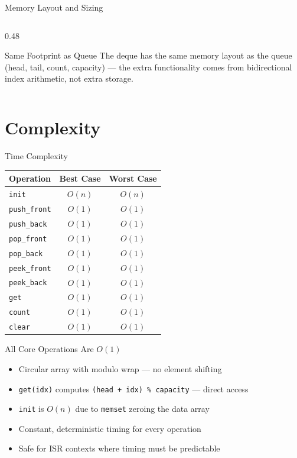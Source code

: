 \documentclass[aspectratio=169, 10pt]{beamer}
\begin{document}
\begin{frame}{Memory Layout and Sizing}
\begin{columns}[T]
\begin{column}{0.48\textwidth}
\vspace{0.3em}
\begin{alertblock}{Same Footprint as Queue}
The deque has the same memory layout as the queue
(head, tail, count, capacity) --- the extra functionality
comes from bidirectional index arithmetic, not extra storage.
\end{alertblock}
\end{column}
\end{columns}
\end{frame}

\section{Complexity}

\begin{frame}{Time Complexity}
\begin{table}
\centering
\begin{tabular}{@{}lcc@{}}
\toprule
\textbf{Operation} & \textbf{Best Case} & \textbf{Worst Case} \\
\midrule
\texttt{init}        & $O(n)$ & $O(n)$ \\
\texttt{push\_front} & $O(1)$ & $O(1)$ \\
\texttt{push\_back}  & $O(1)$ & $O(1)$ \\
\texttt{pop\_front}  & $O(1)$ & $O(1)$ \\
\texttt{pop\_back}   & $O(1)$ & $O(1)$ \\
\texttt{peek\_front} & $O(1)$ & $O(1)$ \\
\texttt{peek\_back}  & $O(1)$ & $O(1)$ \\
\texttt{get}         & $O(1)$ & $O(1)$ \\
\texttt{count}       & $O(1)$ & $O(1)$ \\
\texttt{clear}       & $O(1)$ & $O(1)$ \\
\bottomrule
\end{tabular}
\end{table}

\vspace{0.5em}
\begin{block}{All Core Operations Are $O(1)$}
\begin{itemize}
  \item Circular array with modulo wrap --- no element shifting
  \item \texttt{get(idx)} computes \texttt{(head + idx) \% capacity} --- direct access
  \item \texttt{init} is $O(n)$ due to \texttt{memset} zeroing the data array
  \item Constant, deterministic timing for every operation
  \item Safe for ISR contexts where timing must be predictable
\end{itemize}
\end{block}
\end{frame}
\end{document}
